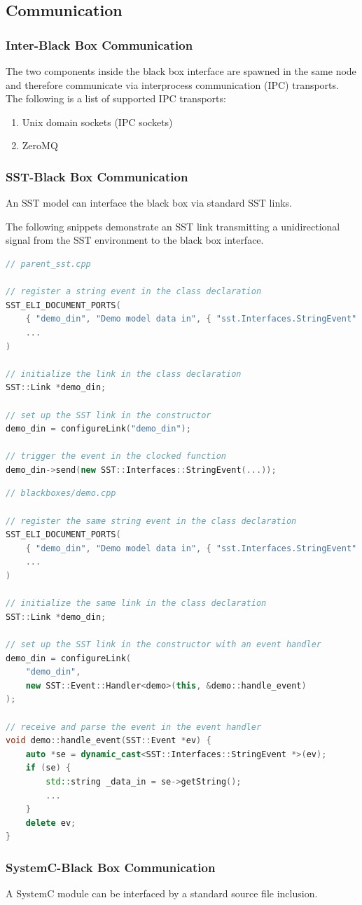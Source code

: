 \documentclass{article}
\begin{document}
    \subsection{Communication}
    \subsubsection{Inter-Black Box Communication}
    The two components inside the black box interface are spawned in the same node and therefore communicate via interprocess communication (IPC) transports. The following is a list of supported IPC transports:
    \begin{enumerate}
        \item Unix domain sockets (IPC sockets)
        \item ZeroMQ
    \end{enumerate}
    
    \subsubsection{SST-Black Box Communication}
    An SST model can interface the black box via standard SST links.
    
    The following snippets demonstrate an SST link transmitting a unidirectional signal from the SST environment to the black box interface.

\begin{lstlisting}[language=C++]
// parent_sst.cpp

// register a string event in the class declaration
SST_ELI_DOCUMENT_PORTS(
    { "demo_din", "Demo model data in", { "sst.Interfaces.StringEvent" }},
    ...
)

// initialize the link in the class declaration
SST::Link *demo_din;

// set up the SST link in the constructor
demo_din = configureLink("demo_din");

// trigger the event in the clocked function
demo_din->send(new SST::Interfaces::StringEvent(...));
\end{lstlisting}

\begin{lstlisting}[language=C++]
// blackboxes/demo.cpp

// register the same string event in the class declaration
SST_ELI_DOCUMENT_PORTS(
    { "demo_din", "Demo model data in", { "sst.Interfaces.StringEvent" }},
    ...
)

// initialize the same link in the class declaration
SST::Link *demo_din;

// set up the SST link in the constructor with an event handler
demo_din = configureLink(
    "demo_din",
    new SST::Event::Handler<demo>(this, &demo::handle_event)
);

// receive and parse the event in the event handler
void demo::handle_event(SST::Event *ev) {
    auto *se = dynamic_cast<SST::Interfaces::StringEvent *>(ev);
    if (se) {
        std::string _data_in = se->getString();
        ...
    }
    delete ev;
}
\end{lstlisting}

\subsubsection{SystemC-Black Box Communication}
A SystemC module can be interfaced by a standard source file inclusion.
\end{document}
